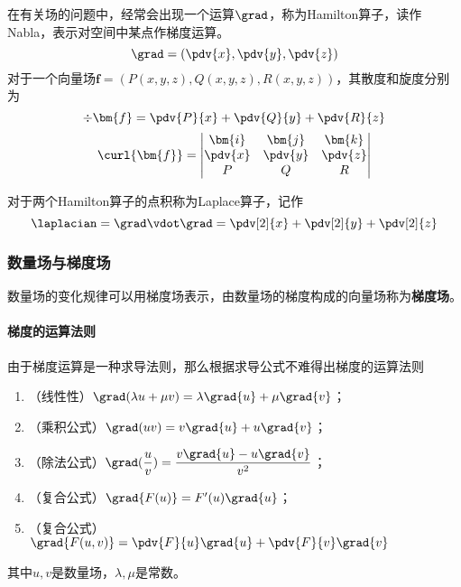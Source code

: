 在有关场的问题中，经常会出现一个运算$\grad$，称为Hamilton算子，读作Nabla，表示对空间中某点作梯度运算。
\[ \grad = \left(\pdv{x},\pdv{y},\pdv{z}\right) \]
对于一个向量场$\bm{f}=(P(x,y,z),Q(x,y,z),R(x,y,z))$，其散度和旋度分别为
\[ \div{\bm{f}} = \pdv{P}{x} + \pdv{Q}{y} + \pdv{R}{z} \]
\[
    \curl{\bm{f}} =
    \begin{vmatrix}
        \bm{i}  & \bm{j}  & \bm{k}  \\
        \pdv{x} & \pdv{y} & \pdv{z} \\
        P       & Q       & R
    \end{vmatrix}
\]

对于两个Hamilton算子的点积称为Laplace算子，记作
\[ \laplacian = \grad \vdot \grad = \pdv[2]{x} + \pdv[2]{y} + \pdv[2]{z} \]

\subsubsection{数量场与梯度场}
数量场的变化规律可以用梯度场表示，由数量场的梯度构成的向量场称为\textbf{\textsf{梯度场}}。

\paragraph{梯度的运算法则}
由于梯度运算是一种求导法则，那么根据求导公式不难得出梯度的运算法则
\begin{enumerate}[(1)]
    \item （线性性）$\grad(\lambda u + \mu v) = \lambda\grad{u} + \mu\grad{v}$；
    \item （乘积公式）$\grad(uv) = v\grad{u} + u\grad{v}$；
    \item （除法公式）$\grad(\dfrac{u}{v}) = \dfrac{v\grad{u}-u\grad{v}}{v^2}$；
    \item （复合公式）$\grad{F(u)} = F'(u)\grad{u}$；
    \item （复合公式）$\grad{F(u,v)} = \pdv{F}{u}\grad{u} + \pdv{F}{v}\grad{v}$
\end{enumerate}
其中$u,v$是数量场，$\lambda,\mu$是常数。

